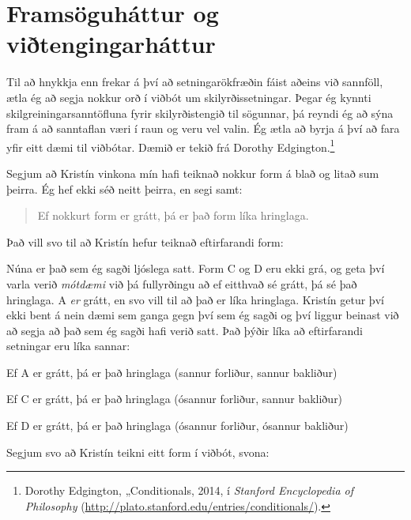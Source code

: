 \section{Framsöguháttur og viðtengingarháttur}\label{s:IndicativeSubjunctive}
Til að hnykkja enn frekar á því að setningarökfræðin fáist aðeins við sannföll, ætla ég að segja nokkur orð í viðbót um skilyrðissetningar. Þegar ég kynnti skilgreiningarsanntöfluna fyrir skilyrðistengið til sögunnar, þá reyndi ég að sýna fram á að sanntaflan væri í raun og veru vel valin. Ég ætla að byrja á því að fara yfir eitt dæmi til viðbótar. Dæmið er tekið frá Dorothy Edgington.\footnote{Dorothy Edgington, „Conditionals, 2014, í \emph{Stanford Encyclopedia of Philosophy} (\url{http://plato.stanford.edu/entries/conditionals/}).} 

Segjum að Kristín vinkona mín hafi teiknað nokkur form á blað og litað sum þeirra. Ég hef ekki séð neitt þeirra, en segi samt:
	\begin{quote}
		Ef nokkurt form er grátt, þá er það form líka hringlaga.
	\end{quote}
Það vill svo til að Kristín hefur teiknað eftirfarandi form:	
\begin{center}
\end{center}
Núna er það sem ég sagði ljóslega satt. Form C og D eru ekki grá, og geta því varla verið \emph{mótdæmi} við þá fullyrðingu að ef eitthvað sé grátt, þá sé það hringlaga. A \emph{er} grátt, en svo vill til að það er líka hringlaga. Kristín getur því ekki bent á nein dæmi sem ganga gegn því sem ég sagði og því liggur beinast við að segja að það sem ég sagði hafi verið satt. Það þýðir líka að eftirfarandi setningar eru líka sannar:
	\begin{ebullet}
		\item Ef A er grátt, þá er það hringlaga \hfill (sannur forliður, sannur bakliður)
		\item Ef C er grátt, þá er það hringlaga \hfill (ósannur forliður, sannur bakliður)
		\item Ef D er grátt, þá er það hringlaga \hfill (ósannur forliður, ósannur bakliður)
	\end{ebullet}
Segjum svo að Kristín teikni eitt form í viðbót, svona:	

